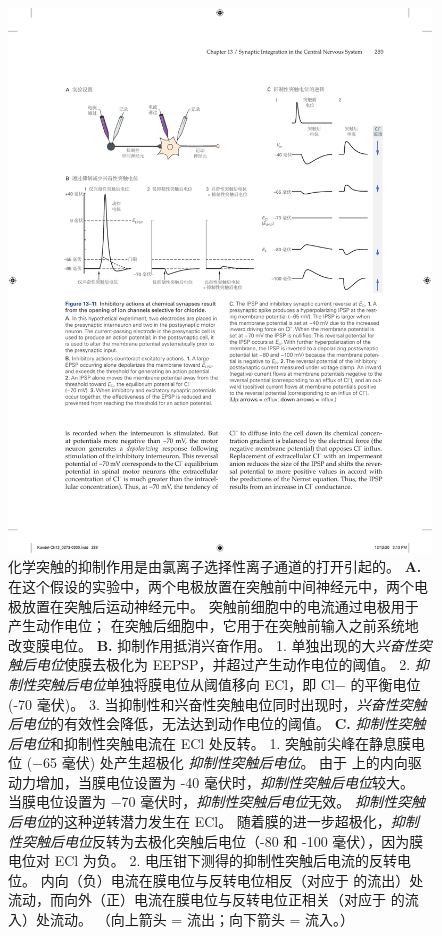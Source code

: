 \begin{figure}[htbp]
	\centering
	\includegraphics[width=0.95\linewidth]{chap13/fig_13_11}
	\caption{化学突触的抑制作用是由氯离子选择性离子通道的打开引起的。
		\textbf{A.} 在这个假设的实验中，两个电极放置在突触前中间神经元中，两个电极放置在突触后运动神经元中。
		突触前细胞中的电流通过电极用于产生动作电位；
		在突触后细胞中，它用于在突触前输入之前系统地改变膜电位。
		\textbf{B.} 抑制作用抵消兴奋作用。
		1. 单独出现的大\textit{兴奋性突触后电位}使膜去极化为 EEPSP，并超过产生动作电位的阈值。
		2. \textit{抑制性突触后电位}单独将膜电位从阈值移向 ECl，即 Cl− 的平衡电位 (-70 毫伏)。
		3. 当抑制性和兴奋性突触电位同时出现时，\textit{兴奋性突触后电位}的有效性会降低，无法达到动作电位的阈值。
		\textbf{C.} \textit{抑制性突触后电位}和抑制性突触电流在 ECl 处反转。
		1. 突触前尖峰在静息膜电位 (−65 毫伏) 处产生超极化 \textit{抑制性突触后电位}。
		由于  上的内向驱动力增加，当膜电位设置为 -40 毫伏时，\textit{抑制性突触后电位}较大。
		当膜电位设置为 −70 毫伏时，\textit{抑制性突触后电位}无效。
		\textit{抑制性突触后电位}的这种逆转潜力发生在 ECl。
		随着膜的进一步超极化，\textit{抑制性突触后电位}反转为去极化突触后电位（-80 和 -100 毫伏），因为膜电位对 ECl 为负。
		2. 电压钳下测得的抑制性突触后电流的反转电位。
		内向（负）电流在膜电位与反转电位相反（对应于  的流出）处流动，而向外（正）电流在膜电位与反转电位正相关（对应于  的流入）处流动。
		（向上箭头 = 流出；向下箭头 = 流入。）}
	\label{fig:13_11}
\end{figure}


